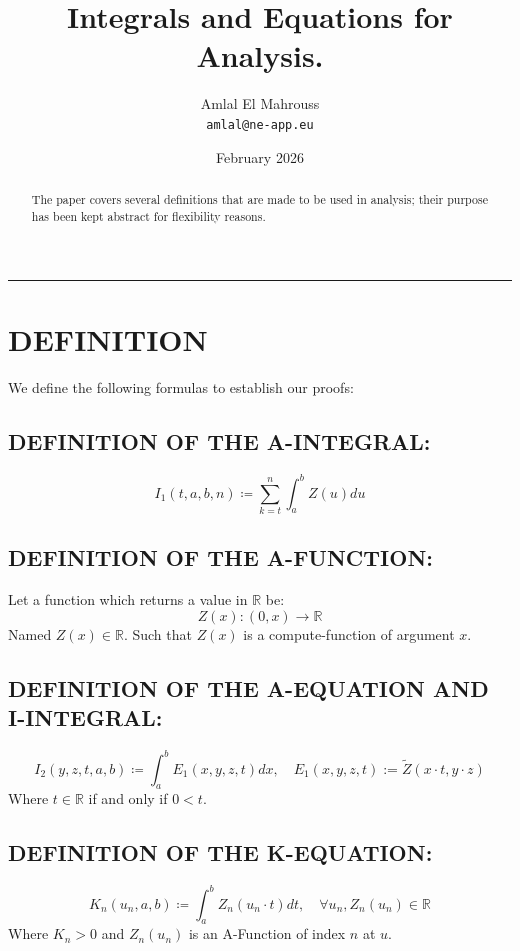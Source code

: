 \documentclass[11pt, a4paper]{article}
\title{Integrals and Equations for Analysis.}
\author{Amlal El Mahrouss\\\texttt{amlal@ne-app.eu}}
\date{February 2026}
\begin{document}
\maketitle

\begin{abstract}
\begin{center}
    The paper covers several definitions that are made to be used in analysis; their purpose has been kept abstract for flexibility reasons.
\end{center}
\end{abstract}

\begin{center}
	\rule[0.01cm]{17cm}{0.01cm}
\end{center}

\section{DEFINITION}

We define the following formulas to establish our proofs:

\subsection{DEFINITION OF THE A-INTEGRAL:}
\begin{equation}
    I_{1}(t, a, b, n) \coloneqq \sum_{k=t}^{n} \int_{a}^{b} Z(u) du
\end{equation}
\subsection{DEFINITION OF THE A-FUNCTION:}
Let a function which returns a value in $\mathbb{R}$ be:
\begin{equation}
	Z(x) : (0, x) \to \mathbb{R}
\end{equation}
Named $Z(x) \in \mathbb{R}$. Such that $Z(x)$ is a compute-function of argument $x$.
\subsection{DEFINITION OF THE A-EQUATION AND I-INTEGRAL:}
\begin{equation}
	I_{2}(y, z, t, a, b) \coloneqq \int_{a}^{b} E_{1}(x, y, z, t) dx, \quad E_{1}(x, y, z, t) := \tilde{Z}(x \cdot t, y \cdot z)
\end{equation}
Where $t \in \mathbb{R}$ if and only if $0 < t$.
\subsection{DEFINITION OF THE K-EQUATION:}
\begin{equation}
	K_{n}(u_{n}, a, b) \coloneqq \int_{a}^{b} Z_{n}(u_{n} \cdot t) dt, \quad \forall u_{n}, Z_{n}(u_{n}) \in \mathbb{R}
\end{equation}
Where $K_{n} > 0$ and $Z_{n}(u_{n})$ is an A-Function of index $n$ at $u$.
\end{document}
